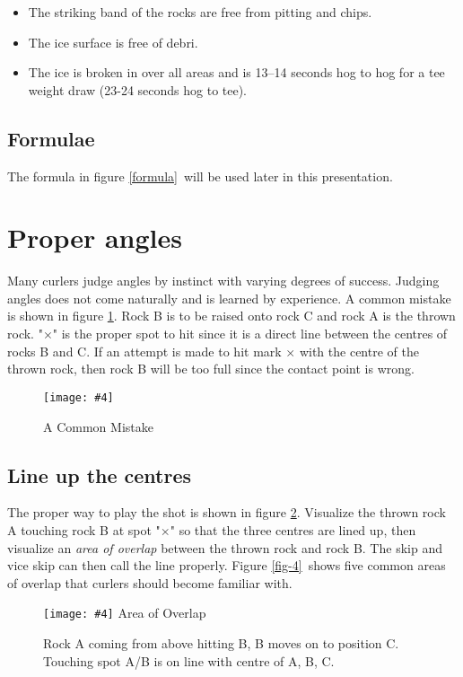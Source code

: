 \documentclass[titlepage,11pt]{article}
\newcommand{\picfile}[4]{%
\begin{figure}[htp]%
    \centering%
	\texttt{[image: \#4]}
    \def\boxX{#3}\ifx\boxX\empty
	\caption{\label{#1} #2}%
    \else
	\caption[#3]{\label{#1} #2}%
    \fi
\end{figure}
}
\newcommand{\prtfloats}{\clearpage}
\begin{document}
\begin{itemize}
\item The striking band of the rocks are free from pitting and chips.
\item The ice surface is free of debri.
\item The ice is broken in over all areas and is 13--14 seconds hog to hog for a
      tee weight draw (23-24 seconds hog to tee).
\end{itemize}

\subsection*{Formulae}

The formula in figure \ref{formula}\ will be used later in this presentation.

\prtfloats

\section{Proper angles}

Many curlers judge angles by instinct with varying degrees of success. Judging
angles does not come naturally and is learned by experience. A common mistake is
shown in figure \ref{fig-2}. Rock B is to be raised onto rock C and rock A is the thrown
rock. "$\times$" is the proper spot to hit since it is a direct line between the
centres of rocks B and C. If an attempt is made to hit mark $\times$ with the centre of
the thrown rock, then rock B will be too full since the contact point is wrong.

\picfile{fig-2}{A Common Mistake}{}{fig02.eps}

\subsection*{Line up the centres}

The proper way to play the shot is shown in figure \ref{fig-3}. Visualize the thrown rock
A touching rock B at spot "$\times$" so that the three centres are lined up, then
visualize an \emph{area of overlap} between the thrown rock and rock B. The skip
and vice skip can then call the line properly. Figure \ref{fig-4}\ shows five common areas
of overlap that curlers should become familiar with.

\picfile{fig-3}{Rock A coming from above hitting B, B moves on to position C.
Touching spot A/B is on line with centre of A, B, C.}{Area of Overlap}{fig03.eps}
\end{document}
